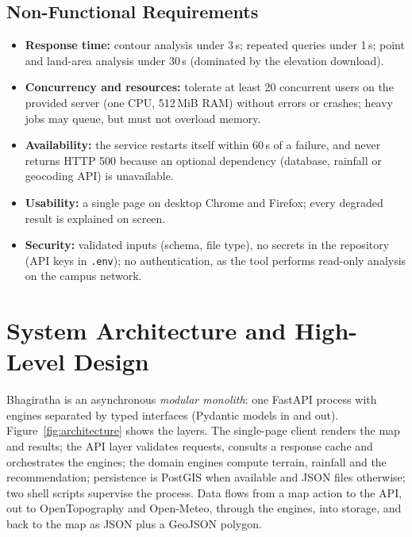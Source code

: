 \documentclass[manuscript,screen,review]{acmart}
\begin{document}
\subsection{Non-Functional Requirements}
\begin{itemize}
    \item \textbf{Response time:} contour analysis under 3\,s; repeated queries under 1\,s; point and land-area analysis under 30\,s (dominated by the elevation download).
    \item \textbf{Concurrency and resources:} tolerate at least 20 concurrent users on the provided server (one CPU, 512\,MiB RAM) without errors or crashes; heavy jobs may queue, but must not overload memory.
    \item \textbf{Availability:} the service restarts itself within 60\,s of a failure, and never returns HTTP 500 because an optional dependency (database, rainfall or geocoding API) is unavailable.
    \item \textbf{Usability:} a single page on desktop Chrome and Firefox; every degraded result is explained on screen.
    \item \textbf{Security:} validated inputs (schema, file type), no secrets in the repository (API keys in \texttt{.env}); no authentication, as the tool performs read-only analysis on the campus network.
\end{itemize}

\section{System Architecture and High-Level Design}
\label{sec:architecture}
Bhagiratha is an asynchronous \emph{modular monolith}: one FastAPI process with engines separated by typed interfaces (Pydantic models in and out). Figure~\ref{fig:architecture} shows the layers. The single-page client renders the map and results; the API layer validates requests, consults a response cache and orchestrates the engines; the domain engines compute terrain, rainfall and the recommendation; persistence is PostGIS when available and JSON files otherwise; two shell scripts supervise the process. Data flows from a map action to the API, out to OpenTopography and Open-Meteo, through the engines, into storage, and back to the map as JSON plus a GeoJSON polygon.
\end{document}
